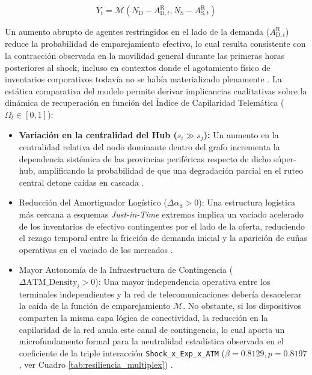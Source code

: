 \begin{equation}
Y_t = \mathcal{M} \left( N_{\text{D}} - A^{\text{R}}_{\text{D},t} , N_{\text{S}} - A^{\text{R}}_{\text{S},t} \right)
\end{equation}

Un aumento abrupto de agentes restringidos en el lado de la demanda ($A^{\text{R}}_{\text{D},t}$) reduce la probabilidad de emparejamiento efectivo, lo cual resulta consistente con la contracci\'on observada en la movilidad general durante las primeras horas posteriores al shock, incluso en contextos donde el agotamiento f\'isico de inventarios corporativos todav\'ia no se hab\'ia materializado plenamente \citep{crouzet2023shocks, chiang1999elements}. La est\'atica comparativa del modelo permite derivar implicancias cualitativas sobre la din\'amica de recuperaci\'on en funci\'on del \'Indice de Capilaridad Telem\'atica ($\Omega_t \in [0,1]$):

\begin{itemize}

    \item \textbf{Variaci\'on en la centralidad del Hub ($s_i \gg s_j$):} Un aumento en la centralidad relativa del nodo dominante dentro del grafo incrementa la dependencia sist\'emica de las provincias perif\'ericas respecto de dicho s\'uper-hub, amplificando la probabilidad de que una degradaci\'on parcial en el ruteo central detone ca\'idas en cascada \citep{acemoglu2012network}.
    \item Reducci\'on del Amortiguador Log\'istico ($\Delta \alpha_{\text{S}} > 0$): Una estructura log\'istica m\'as cercana a esquemas \textit{Just-in-Time} extremos implica un vaciado acelerado de los inventarios de efectivo contingentes por el lado de la oferta, reduciendo el rezago temporal entre la fricci\'on de demanda inicial y la aparici\'on de cu\~nas operativas en el vaciado de los mercados \citep{carvalho2021supply}.
    \item Mayor Autonom\'ia de la Infraestructura de Contingencia ($\Delta \text{ATM\_Density}_i > 0$): Una mayor independencia operativa entre los terminales independientes y la red de telecomunicaciones deber\'ia desacelerar la ca\'ida de la funci\'on de emparejamiento $\mathcal{M}$. No obstante, si los dispositivos comparten la misma capa l\'ogica de conectividad, la reducci\'on en la capilaridad de la red anula este canal de contingencia, lo cual aporta un microfundamento formal para la neutralidad estad\'istica observada en el coeficiente de la triple interacci\'on \texttt{Shock\_x\_Exp\_x\_ATM} ($\beta = 0.8129, p = 0.8197$, ver Cuadro \ref{tab:resiliencia_multiplex}) \citep{alvarez2009financial}.
\end{itemize}

